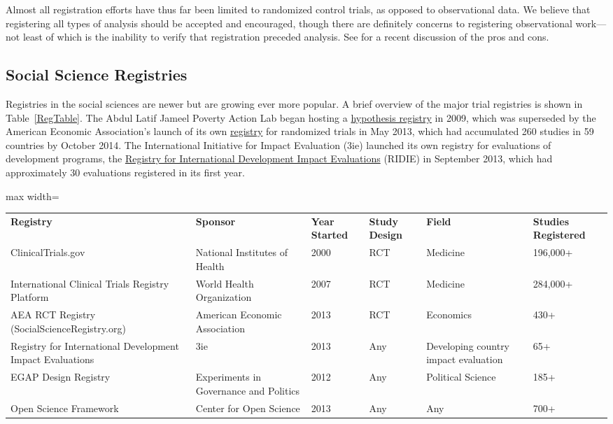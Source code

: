 \documentclass[12pt] {article}
\begin{document}
Almost all registration efforts have thus far been limited to randomized
control trials, as opposed to observational data. We believe
that registering all types of analysis should be accepted and encouraged, though there are definitely concerns to registering observational work---not least of which is the inability to verify that registration preceded analysis. See \cite{dal-re_making_2014} for a recent discussion of the pros and cons.
 
\subsection{Social Science Registries}\label{social-science-registries}

Registries in the social sciences are newer but are growing ever more
popular. A brief overview of the major trial registries is shown in Table~\ref{RegTable}. The Abdul Latif Jameel Poverty Action Lab began hosting a
\href{http://www.povertyactionlab.org/hypothesis-registry}{hypothesis registry}
 in 2009, which was superseded by the American Economic Association's launch of its own \href{http://socialscienceregistry.org}{registry} for randomized trials in May 2013, which had accumulated 260 studies in 59 countries by
October 2014. The International Initiative for Impact Evaluation (3ie)
launched its own registry for evaluations of development programs, the
\href{http://ridie.3ieimpact.org}{Registry for International Development Impact Evaluations} (RIDIE) in September 2013, which had
approximately 30 evaluations registered in its first year.



\begin{sidewaystable}[]
\centering
\caption{Registries in Medicine and the Social Sciences}
\label{RegTable}
\begin{adjustbox}{max width=\textwidth}
\begin{tabular}{llllll}
{\bf Registry} & {\bf Sponsor} & {\bf Year Started} & {\bf Study Design} & {\bf Field} & {\bf Studies Registered} \\
ClinicalTrials.gov & National Institutes of Health & 2000 & RCT & Medicine & 196,000+ \\
International Clinical Trials Registry Platform & World Health Organization & 2007 & RCT & Medicine & 284,000+ \\
AEA RCT Registry (SocialScienceRegistry.org) & American Economic Association & 2013 & RCT & Economics & 430+ \\
Registry for International Development Impact Evaluations & 3ie & 2013 & Any & Developing country impact evaluation & 65+ \\
EGAP Design Registry & Experiments in Governance and Politics & 2012 & Any & Political Science & 185+ \\
Open Science Framework & Center for Open Science & 2013 & Any & Any & 700+
\end{tabular}
\end{adjustbox}
\end{sidewaystable}
\end{document}
